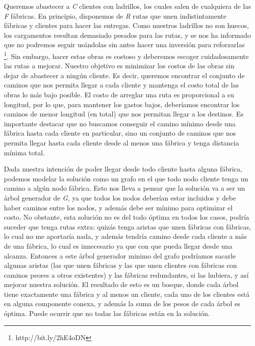 \documentclass[a4paper]{report}
\begin{document}
Queremos abastecer a \textit{C} clientes con ladrillos, los cuales salen de cualquiera de las \textit{F} fábricas. En principio, disponemos de \textit{R} rutas que unen indistintamente fábricas y clientes para hacer las entregas. Como nuestros ladrillos no son huecos, los cargamentos resultan demasiado pesados para las rutas, y se nos ha informado que no podremos seguir usándolas sin antes hacer una inversión para reforzarlas \footnote{http://bit.ly/2hE4oDN}. Sin embargo, hacer estas obras es costoso y deberemos escoger cuidadosamente las rutas a mejorar. Nuestro objetivo es minimizar los costos de las obras sin dejar de abastecer a ningún cliente. Es decir, queremos encontrar el conjunto de caminos que nos permita llegar a cada cliente y mantenga el costo total de las obras lo más bajo posible. El costo de arreglar una ruta es proporcional a su longitud, por lo que, para mantener los gastos bajos, deberíamos encontrar los caminos de menor longitud (en total) que nos permitan llegar a los destinos. Es importante destacar que no buscamos conseguir el camino mínimo desde una fábrica hasta cada cliente en particular, sino un conjunto de caminos que nos permita llegar hasta cada cliente desde al menos una fábrica y tenga distancia mínima total.

Dada nuestra intención de poder llegar desde todo cliente hasta alguna fábrica, podemos modelar la solución como un grafo en el que todo nodo cliente tenga un camino a algún nodo fábrica. Esto nos lleva a pensar que la solución va a ser un árbol generador de \textit{G}, ya que todos los nodos deberían estar incluidos y debe haber caminos entre los nodos, y además debe ser mínimo para optimizar el costo. No obstante, esta solución no es del todo óptima en todos los casos, podría suceder que tenga rutas extra: quizás tenga aristas que unen fábricas con fábricas, lo cual no me aportaría nada, y además tendría camino desde cada cliente a más de una fábrica, lo cual es innecesario ya que con que pueda llegar desde una alcanza. Entonces a este árbol generador minimo del grafo podríamos sacarle algunas aristas (las que unen fábricas y las que unen clientes con fábricas con caminos peores a otros existentes) y las fábricas redundantes, si las hubiera, y así mejorar nuestra solución. El resultado de esto es un bosque, donde cada árbol tiene exactamente una fábrica y al menos un cliente, cada uno de los clientes está en alguna componente conexa, y además la suma de los pesos de cada árbol es óptima. Puede ocurrir que no todas las fábricas están en la solución.
\end{document}
